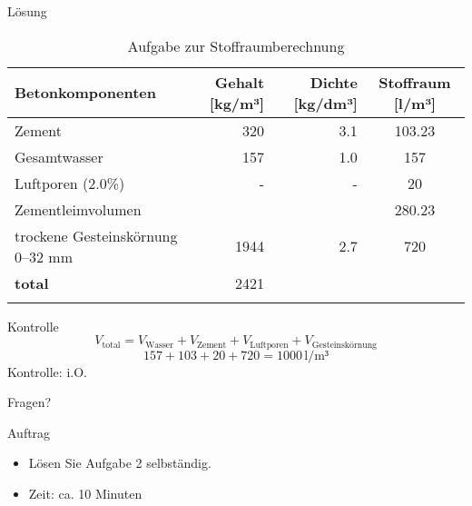 \begin{frame}{Lösung}
    \begin{table}[h]
        \centering
        \caption{Aufgabe zur Stoffraumberechnung}
        \small
        \begin{tabular}{lrrc}
        \toprule
        \textbf{Betonkomponenten}       & \textbf{Gehalt [kg/m³]} & \textbf{Dichte [kg/dm³]} & \textbf{Stoffraum [l/m³]} \\ 
        \midrule
        Zement                           & 320                      & 3.1                       &    103.23          \\
        Gesamtwasser                     & 157                      & 1.0                       &  157            \\
        Luftporen (2.0\%)                & -                        & -                         & 20              \\
        Zementleimvolumen                &                          &                           & 280.23                          \\
        trockene Gesteinskörnung 0–32 mm & 1944                     & 2.7                       & 720              \\
        \textbf{total}                   & 2421         &                           & {}             \\
        \bottomrule
        \label{tab:Stoffraumberechnung}
        \end{tabular}
        \end{table}

\end{frame}

\begin{frame}{Kontrolle}
    \begin{equation*}
    V_\text{total} = V_{\text{Wasser}} + V_{\text{Zement}} + V_{\text{Luftporen}} + V_{\text{Gesteinskörnung}}
    \end{equation*}
    \pause
    \vspace{1cm}
    \begin{equation*}
        157 + 103 + 20 + 720 = 1000 \, \text{l/m³}
    \end{equation*}
    \pause
    Kontrolle: i.O.


\end{frame}

\begin{frame}{Fragen?}

\end{frame}

\begin{frame}{Auftrag}
\begin{itemize}
    \item Lösen Sie Aufgabe 2 selbständig.
    \item Zeit: ca. 10 Minuten
\end{itemize}

\end{frame}







